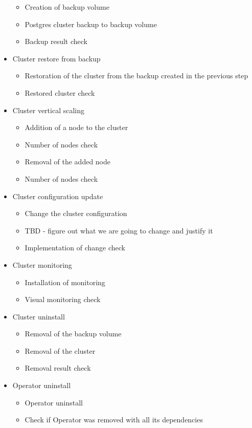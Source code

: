\begin{itemize}
        \begin{itemize}
          \item Creation of backup volume
          \item Postgres cluster backup to backup volume
          \item Backup result check
        \end{itemize}
  \item Cluster restore from backup
        \begin{itemize}
          \item Restoration of the cluster from the backup created in the previous step
          \item Restored cluster check
        \end{itemize}
  \item Cluster vertical scaling
        \begin{itemize}
          \item Addition of a node to the cluster
          \item Number of nodes check
          \item Removal of the added node
          \item Number of nodes check
        \end{itemize}
  \item Cluster configuration update
        \begin{itemize}
          \item Change the cluster configuration
          \item TBD - figure out what we are going to change and justify it
          \item Implementation of change check
        \end{itemize}
  \item Cluster monitoring
        \begin{itemize}
          \item Installation of monitoring
          \item Visual monitoring check
        \end{itemize}
  \item Cluster uninstall
        \begin{itemize}
          \item Removal of the backup volume
          \item Removal of the cluster
          \item Removal result check
        \end{itemize}
  \item Operator uninstall
        \begin{itemize}
          \item Operator uninstall
          \item Check if Operator was removed with all its dependencies
        \end{itemize}
\end{itemize}


